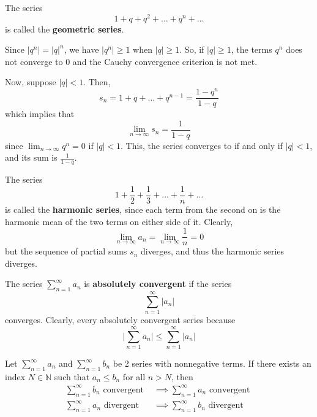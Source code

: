 \documentclass{article}
\begin{document}
    \begin{example}
      The series 
      \begin{equation}
        1 + q + q^2 + \ldots + q^n + \ldots
      \end{equation}
      is called the \textbf{geometric series}. 

      Since $|q^n| = |q|^n$, we have $|q^n| \geq 1$ when $|q| \geq 1$. So, if $|q| \geq 1$, the terms $q^n$ does not converge to $0$ and the Cauchy convergence criterion is not met. 

      Now, suppose $|q|<1$. Then, 
      \begin{equation}
        s_n = 1 + q + \ldots + q^{n-1} = \frac{1 - q^n}{1-q}
      \end{equation}
      which implies that
      \begin{equation}
        \lim_{n\rightarrow \infty} s_n = \frac{1}{1-q}
      \end{equation}
      since $\lim_{n\rightarrow \infty} q^n = 0$ if $|q|<1$. This, the series converges to if and only if $|q|<1$, and its sum is $\frac{1}{1-q}$. 
    \end{example}

    \begin{example}
      The series 
      \begin{equation}
        1 + \frac{1}{2} + \frac{1}{3} + \ldots + \frac{1}{n} + \ldots
      \end{equation}
      is called the \textbf{harmonic series}, since each term from the second on is the harmonic mean of the two terms on either side of it. Clearly, 
      \begin{equation}
        \lim_{n \rightarrow \infty} a_n = \lim_{n \rightarrow \infty} \frac{1}{n} = 0
      \end{equation}
      but the sequence of partial sums $s_n$ diverges, and thus the harmonic series diverges. 
    \end{example}

    \begin{definition}
      The series $\sum_{n=1}^\infty a_n$ is \textbf{absolutely convergent} if the series 
      \[\sum_{n=1}^\infty |a_n|\]
      converges. Clearly, every absolutely convergent series because 
      \[\bigg|\sum_{n=1}^\infty a_n \bigg| \leq \sum_{n=1}^\infty |a_n|\]
    \end{definition}

    \begin{theorem}
    Let $\sum_{n=1}^\infty a_n$ and $\sum_{n=1}^\infty b_n$ be 2 series with nonnegative terms. If there exists an index $N \in \mathbb{N}$ such that $a_n \leq b_n$ for all $n >N$, then 
    \begin{align*}
        \sum_{n=1}^\infty b_n \text{ convergent } & \implies \sum_{n=1}^\infty a_n \text{ convergent } \\
        \sum_{n=1}^\infty a_n \text{ divergent } & \implies \sum_{n=1}^\infty b_n \text{ divergent }
    \end{align*}
    \end{theorem}
\end{document}
